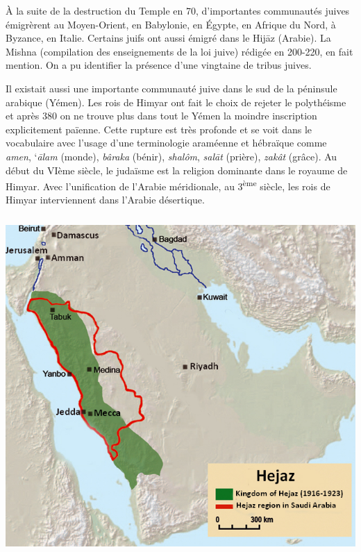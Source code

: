 À la suite de la destruction du Temple en 70, d'importantes communautés
juives émigrèrent au Moyen-Orient, en Babylonie, en Égypte, en Afrique
du Nord, à Byzance, en Italie. Certains juifs ont aussi émigré dans le
Hijāz (Arabie). La Mishna (compilation des enseignements de la loi
juive) rédigée en 200-220, en fait mention. On a pu identifier la
présence d'une vingtaine de tribus juives.

Il existait aussi une importante communauté juive dans le sud de la
péninsule arabique (Yémen). Les rois de Himyar ont fait le choix de
rejeter le polythéisme et après 380 on ne trouve plus dans tout le Yémen
la moindre inscription explicitement païenne. Cette rupture est très
profonde et se voit dans le vocabulaire avec l'usage d'une terminologie
araméenne et hébraïque comme \emph{amen}, `\emph{ālam} (monde),
\emph{bâraka} (bénir), \emph{shalôm}, \emph{salāt} (prière),
\emph{zakât} (grâce). Au début du VIème siècle, le judaïsme est la
religion dominante dans le royaume de Himyar. Avec l'unification de l'Arabie méridionale,
au 3\textsuperscript{ème} siècle, les rois de Himyar interviennent dans
l'Arabie désertique.

\includegraphics[width=5.51181in,height=5.07222in]{Images/image030.jpg}


